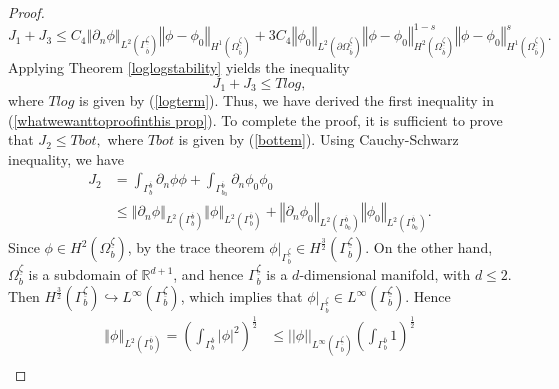 \documentclass[11pt]{article}
\begin{document}
\begin{proof}
	\begin{equation}\label{upperboundI23}
		J_1+J_3\leq C_4 \left\Vert \partial_n \phi\right\Vert_{L^{2}(\Gamma_{\overline{b}}^{\underline{\zeta}} )}\left\Vert  \phi-\phi_0\right\Vert_{H^{1}(\Omega_{\overline{b}}^{\underline{\zeta}} )} + 3C_4\left\Vert  \phi_0\right\Vert_{L^{2}(\partial\Omega_{\overline{b}}^{\underline{\zeta}} )} \left\Vert \phi-\phi_0 \right\Vert^{1-s}_{H^{2}(\Omega_{\overline{b}}^{\underline{\zeta}} )}\left\Vert \phi-\phi_0 \right\Vert^s_{H^{1}(\Omega_{\overline{b}}^{\underline{\zeta}} )}.
	\end{equation}
	Applying Theorem \ref{loglogstability} yields the inequality 
	$$J_1+J_3\leq Tlog,$$
	where $Tlog$ is given by (\ref{logterm}). Thus, we have derived the first inequality in (\ref{whatwewanttoproofinthis prop}).
	To complete the proof, it is sufficient to prove that
	$J_2\leq Tbot,$ where  $Tbot$  is given by (\ref{bottem}).
	Using Cauchy-Schwarz inequality, we have 
	\begin{equation}\label{tbotfinalI2}
		\begin{split}
			J_2&=\displaystyle\int_{\Gamma_{b}^{\overline{b}}} \partial_n\phi \phi + \displaystyle\int_{\Gamma_{b_0}^{\overline{b}}} \partial_n\phi_0 \phi_0\\
			&\leq \left\Vert \partial_n \phi\right\Vert_{L^{2}(\Gamma_{b}^{\overline{b}} )} \left\Vert \phi\right\Vert_{L^{2}(\Gamma_{b}^{\overline{b}} )}+\left\Vert \partial_n \phi_0\right\Vert_{L^{2}(\Gamma_{b_0}^{\overline{b}} )} \left\Vert \phi_0\right\Vert_{L^{2}(\Gamma_{b_0}^{\overline{b}} )}. 
		\end{split}
	\end{equation}
	Since $\phi\in H^2({\Omega_{b}^{\underline{\zeta}}})$, by the trace theorem $\phi|_{\Gamma_{b}^{\underline{\zeta}}}\in H^{\frac{3}{2}}(\Gamma_{b}^{\underline{\zeta}})$.
	On the other hand, $\Omega_{b}^{\underline{\zeta}}$ is a subdomain of $\mathbb{R}^{d+1}$, and hence $\Gamma_{b}^{\underline{\zeta}}$ is a $d$-dimensional  manifold, with $d\le 2$. Then  $ H^{\frac{3}{2} }(\Gamma_{b}^{\underline{\zeta}})\hookrightarrow L^\infty (\Gamma_{b}^{\underline{\zeta}})$, which  implies that $\phi|_{\Gamma_{b}^{\underline{\zeta}}}\in L^{\infty}(\Gamma_{b}^{\underline{\zeta}}).$ Hence 
	\begin{equation}\label{tbotfinalI22}
		\begin{split}
			\left\Vert \phi\right\Vert_{L^{2}(\Gamma_{b}^{\overline{b}} )}=\left(\displaystyle\int_{\Gamma_{b}^{\overline{b}}} |\phi|^2\right)^{\frac{1}{2}}&\leq ||\phi||_{L^{\infty}(\Gamma_{b}^{\underline{\zeta}})} \left(\displaystyle\int_{\Gamma_{b}^{\overline{b}}} 1 \right)^{\frac{1}{2}}\\  

\end{split}
\end{equation}
\end{proof}
\end{document}
